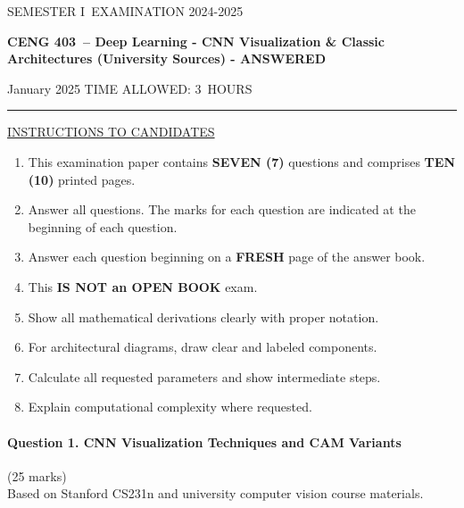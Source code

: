 \documentclass[12pt]{article}
\newcommand{\masunitnumber}{CENG 403}
\newcommand{\examdate}{January 2025}
\newcommand{\academicyear}{2024-2025}
\newcommand{\semester}{I}
\newcommand{\coursename}{Deep Learning - CNN Visualization \& Classic Architectures (University Sources) - ANSWERED}
\newcommand{\numberofhours}{3}
\begin{document}
\setlength{\headsep}{5truemm}
\setlength{\headheight}{14.5truemm}
\setlength{\voffset}{-0.45truein}
\renewcommand{\headrulewidth}{0.0pt}
\begin{center}
SEMESTER \semester\ EXAMINATION \academicyear
\end{center}
\begin{center}
{\bf \masunitnumber\ -- \coursename}
\end{center}
\vspace{20truemm}
\noindent \examdate\hspace{45truemm} TIME ALLOWED: \numberofhours\ HOURS
\vspace{19truemm}
\hrule
\vspace{19truemm}
\noindent\underline{INSTRUCTIONS TO CANDIDATES}
\vspace{8truemm}
\begin{enumerate}
\item This examination paper contains {\bf SEVEN (7)} questions and comprises 
{\bf TEN (10)} printed pages.
\item Answer all questions. 
The marks for each question are indicated at the beginning of each question.
\item Answer each question beginning on a {\bf FRESH} page of the answer book.
\item This {\bf IS NOT an OPEN BOOK} exam.
\item Show all mathematical derivations clearly with proper notation.
\item For architectural diagrams, draw clear and labeled components.
\item Calculate all requested parameters and show intermediate steps.
\item Explain computational complexity where requested.
\end{enumerate}
\newpage
\lhead{}
\rhead{\masunitnumber}
\chead{}
\lfoot{}
\cfoot{\thepage}
\rfoot{}
\setlength{\footskip}{45pt}

\paragraph{Question 1. CNN Visualization Techniques and CAM Variants}{\hfill (25 marks)}\\
Based on Stanford CS231n and university computer vision course materials.
\end{document}
